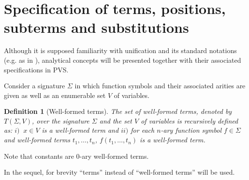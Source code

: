 \documentclass[submission,copyright,creativecommons]{eptcs}
\newtheorem{definition}{Definition}
\begin{document}
\section{Specification of terms, positions, subterms and
  substitutions}\label{Sec:specification}

Although it is supposed familiarity with unification and its standard
notations (e.g. as in \cite{BaNi98,Te2003}), analytical concepts will
be presented together with their associated specifications in PVS.

Consider a signature $\Sigma$ in which function symbols and their
associated arities are given as well as an enumerable set $V$ of
variables.

\begin{definition}[Well-formed terms]
  The set of well-formed terms, denoted by $T(\Sigma,V)$, over the
  signature $\Sigma$ and the set $V$ of variables is recursively
  defined as: $i)\;\; x\in V$ is a well-formed term and $ii)$ for each
  $n$-ary function symbol $f\in\Sigma$ and well-formed terms
  $t_1,\ldots,t_n$, $f(t_1,\ldots,t_n)$ is a well-formed term.
\end{definition}

Note that constants are $0$-ary well-formed terms.

In the sequel, for brevity ``terms'' instead of ``well-formed terms''
will be used.
\end{document}
